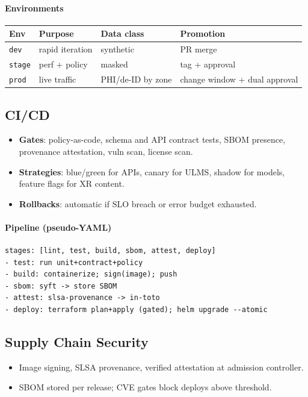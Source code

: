 \documentclass[11pt]{article}
\theoremstyle{plain}
\begin{document}
\paragraph{Environments}
\begin{center}
\begin{tabular}{l l l l}
\hline
Env & Purpose & Data class & Promotion \\
\hline
\texttt{dev} & rapid iteration & synthetic & PR merge \\
\texttt{stage} & perf + policy & masked & tag + approval \\
\texttt{prod} & live traffic & PHI/de-ID by zone & change window + dual approval \\
\hline
\end{tabular}
\end{center}

\subsection{CI/CD}
\begin{itemize}
  \item \textbf{Gates}: policy-as-code, schema and API contract tests, SBOM presence, provenance attestation, vuln scan, license scan.
  \item \textbf{Strategies}: blue/green for APIs, canary for ULMS, shadow for models, feature flags for XR content.
  \item \textbf{Rollbacks}: automatic if SLO breach or error budget exhausted.
\end{itemize}

\paragraph{Pipeline (pseudo-YAML)}
\begin{verbatim}
stages: [lint, test, build, sbom, attest, deploy]
- test: run unit+contract+policy
- build: containerize; sign(image); push
- sbom: syft -> store SBOM
- attest: slsa-provenance -> in-toto
- deploy: terraform plan+apply (gated); helm upgrade --atomic
\end{verbatim}

\subsection{Supply Chain Security}
\begin{itemize}
  \item Image signing, SLSA provenance, verified attestation at admission controller.
  \item SBOM stored per release; CVE gates block deploys above threshold.
\end{itemize}
\end{document}

